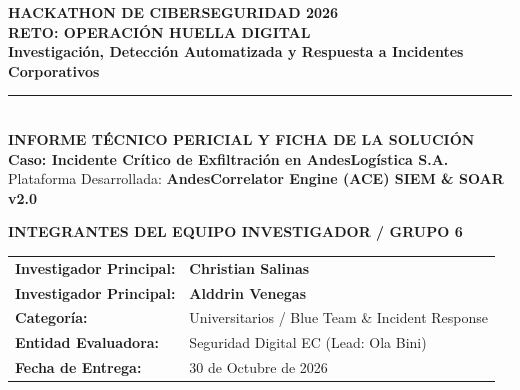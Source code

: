 \documentclass[11pt,a4paper]{article}
\begin{document}
\begin{titlepage}
    \centering
    \vspace*{0.5cm}
    
    {\Huge \textbf{\color{primaryblue}HACKATHON DE CIBERSEGURIDAD 2026}}\\[0.3cm]
    {\LARGE \textbf{\color{accentblue}RETO: OPERACIÓN HUELLA DIGITAL}}\\[0.2cm]
    {\large \textbf{Investigación, Detección Automatizada y Respuesta a Incidentes Corporativos}}\\[0.1cm]
    \rule{\textwidth}{1.5pt}\\[0.8cm]
    
    {\LARGE \textbf{INFORME TÉCNICO PERICIAL Y FICHA DE LA SOLUCIÓN}}\\[0.3cm]
    {\Large \color{threatred}\textbf{Caso: Incidente Crítico de Exfiltración en AndesLogística S.A.}}\\[0.2cm]
    {\large Plataforma Desarrollada: \textbf{AndesCorrelator Engine (ACE) SIEM \& SOAR v2.0}}\\[1.2cm]
    
    \begin{tcolorbox}[colback=lightbg, colframe=accentblue, width=0.95\textwidth, arc=2mm, boxrule=1pt]
        \centering
        \vspace{0.2cm}
        {\large \textbf{INTEGRANTES DEL EQUIPO INVESTIGADOR / GRUPO 6}}\\[0.4cm]
        \begin{tabular}{ll}
            \textbf{Investigador Principal:} & \textbf{Christian Salinas} \\
            \textbf{Investigador Principal:} & \textbf{Alddrin Venegas} \\
            \textbf{Categoría:} & Universitarios / Blue Team \& Incident Response \\
            \textbf{Entidad Evaluadora:} & Seguridad Digital EC (Lead: Ola Bini) \\
            \textbf{Fecha de Entrega:} & 30 de Octubre de 2026 \\
        \end{tabular}
        \vspace{0.2cm}
    \end{tcolorbox}
    
    \vspace{0.8cm}
    

\end{titlepage}
\end{document}

